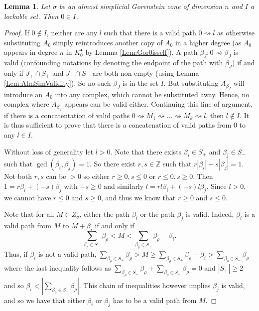 \documentclass[reqno, 12pt]{amsart}
\newtheorem{lemma}[theorem]{Lemma}
\theoremstyle{definition}
\numberwithin{equation}{section}
\newcommand{\Z}{\mathbb{Z}}
\begin{document}
\begin{lemma}
    \label{Lem:AlmGor0isUnsub}
    Let $\sigma$ be an almost simplicial Gorenstein cone of dimension $n$ and $I$ a lockable set. Then $0\in I$.
\end{lemma}
\begin{proof}
    If $0\not\in I$, neither are any $l$ such that there is a valid path $0\rightsquigarrow l$ as otherwise substituting $A_0$ simply reintroduces another copy of $A_0$ in a higher degree (as $A_0$ appears in degree $n$ in $K_0^\bullet$ by Lemma \ref{Lem:Gor0isself}). A path $\beta_J:0\rightsquigarrow \beta_J$ is valid (confounding notations by denoting the endpoint of the path with $\beta_J$) if and only if $J_+\cap S_+$ and $J_-\cap S_-$ are both non-empty (using Lemma \ref{Lem:AlmSimValidity}). So no such $\beta_J$ is in the set $I$. But substituting $A_{\beta_J}$ will introduce an $A_0$ into any complex, which cannot be substituted away. Hence, no complex where $A_{\beta_J}$ appears can be valid either. Continuing this line of argument, if there is a concatentation of valid paths $0\rightsquigarrow M_1\rightsquigarrow\dots\rightsquigarrow M_k\rightsquigarrow l$, then $l\not \in I$.
    It is thus sufficient to prove that there is a concatenation of valid paths from $0$ to any $l\in I$.
    
    Without loss of generality let $l>0$. Note that there exists $\beta_i\in S_+$ and $\beta_j\in S_-$ such that $\gcd{(\beta_i,\beta_j)}=1$. 
    So there exist $r,s\in \Z$ such that $r|\beta_i|+s|\beta_j|=1$.
    Not both $r,s$ can be $>0$ so either $r\ge0, s\le0$ or $r\le0, s\ge0$. Then $1=r\beta_i+(-s)\beta_j$ with $-s\ge 0$ and similarly $l=rl\beta_i+(-s)l\beta_j$. Since $l>0$, we cannot have $r\le 0$ and $s\ge 0$, and thus we know that $r\ge0$ and $s\le 0$.
    
    Note that for all $M\in Z_\sigma$, either the path $\beta_i$ or the path $\beta_j$ is valid. Indeed, $\beta_i$ is a valid path from $M$ to $M+\beta_i$ if and only if \[
    \sum_{\beta_\rho\in S_-}\beta_\rho<M<\sum_{\beta_\rho\in S_+}\beta_\rho - \beta_i.
    \]
    Thus, if $\beta_i$ is not a valid path, $\sum_{\beta_\rho\in S_+}\beta_\rho>M\ge\sum_{\beta_\rho\in S_+}\beta_\rho - \beta_i>\sum_{\beta_\rho\in S_-}\beta_\rho$ where the last inequality follows as $\sum_{\beta_\rho\in S_-}\beta_\rho+\sum_{\beta_\rho\in S_+}\beta_\rho=0$ and $|S_+|\ge 2$ and so $\beta_i<|\sum_{\beta_\rho\in S_-}\beta_\rho|$. This chain of inequalities however implies $\beta_j$ is valid, and so we have that either $\beta_i$ or $\beta_j$ has to be a valid path from $M$.


\end{proof}
\end{document}

